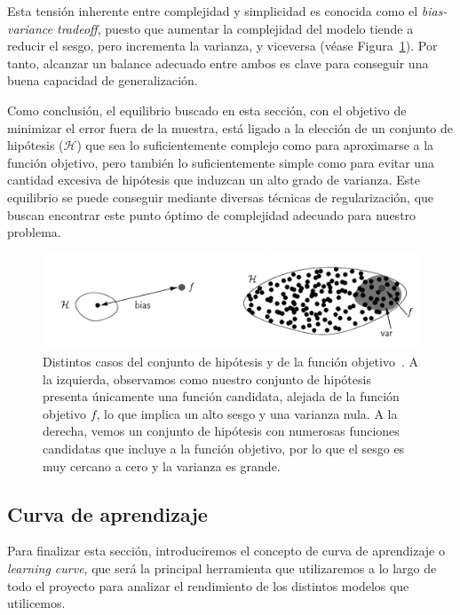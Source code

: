 Esta tensión inherente entre complejidad y simplicidad es conocida como el \textit{bias-variance tradeoff}, puesto que aumentar la complejidad del modelo tiende a reducir el sesgo, pero incrementa la varianza, y viceversa (véase Figura~\ref{fig:bias-variance}). Por tanto, alcanzar un balance adecuado entre ambos es clave para conseguir una buena capacidad de generalización.

Como conclusión, el equilibrio buscado en esta sección, con el objetivo de minimizar el error fuera de la muestra, está ligado a la elección de un conjunto de hipótesis ($\mathcal{H}$) que sea lo suficientemente complejo como para aproximarse a la función objetivo, pero también lo suficientemente simple como para evitar una cantidad excesiva de hipótesis que induzcan un alto grado de varianza. Este equilibrio se puede conseguir mediante diversas técnicas de regularización, que buscan encontrar este punto óptimo de complejidad adecuado para nuestro problema.


\begin{figure}[h]
    \centering
    \includegraphics[width=0.7\linewidth]{img/bias-variance.png}
    \caption[Distintos casos del conjunto de hipótesis y de la función objetivo.] {Distintos casos del conjunto de hipótesis y de la función objetivo~\cite{Mostafa2012}. A la izquierda, observamos como nuestro conjunto de hipótesis presenta únicamente una función candidata, alejada de la función objetivo $f$, lo que implica un alto sesgo y una varianza nula. A la derecha, vemos un conjunto de hipótesis con numerosas funciones candidatas que incluye a la función objetivo, por lo que el sesgo es muy cercano a cero y la varianza es grande.}\label{fig:bias-variance}
\end{figure}

\subsection{Curva de aprendizaje}

Para finalizar esta sección, introduciremos el concepto de curva de aprendizaje o \emph{learning curve}, que será la principal herramienta que utilizaremos a lo largo de todo el proyecto para analizar el rendimiento de los distintos modelos que utilicemos.

